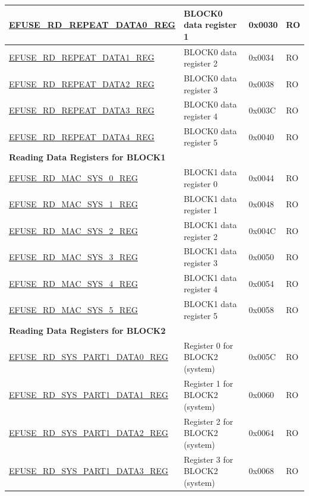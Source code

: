 \begin{longtable}{ | p{7cm} | p{7.2cm} | p{1.3cm} | p{1cm} | }
\hyperref[regdesc:EFUSERDREPEATDATA0REG]{EFUSE\_RD\_REPEAT\_DATA0\_REG} & BLOCK0 data register 1 & 0x0030 & RO \\ \hline
\hyperref[regdesc:EFUSERDREPEATDATA1REG]{EFUSE\_RD\_REPEAT\_DATA1\_REG} & BLOCK0 data register 2 & 0x0034 & RO \\ \hline
\hyperref[regdesc:EFUSERDREPEATDATA2REG]{EFUSE\_RD\_REPEAT\_DATA2\_REG} & BLOCK0 data register 3 & 0x0038 & RO \\ \hline
\hyperref[regdesc:EFUSERDREPEATDATA3REG]{EFUSE\_RD\_REPEAT\_DATA3\_REG} & BLOCK0 data register 4 & 0x003C & RO \\ \hline
\hyperref[regdesc:EFUSERDREPEATDATA4REG]{EFUSE\_RD\_REPEAT\_DATA4\_REG} & BLOCK0 data register 5 & 0x0040 & RO \\ \hline
\multicolumn{4}{|l|}{\textbf{Reading Data Registers for BLOCK1}} \\ \hline
\hyperref[regdesc:EFUSERDMACSYS0REG]{EFUSE\_RD\_MAC\_SYS\_0\_REG} & BLOCK1 data register 0 & 0x0044 & RO \\ \hline
\hyperref[regdesc:EFUSERDMACSYS1REG]{EFUSE\_RD\_MAC\_SYS\_1\_REG} & BLOCK1 data register 1 & 0x0048 & RO \\ \hline
\hyperref[regdesc:EFUSERDMACSYS2REG]{EFUSE\_RD\_MAC\_SYS\_2\_REG} & BLOCK1 data register 2 & 0x004C & RO \\ \hline
\hyperref[regdesc:EFUSERDMACSYS3REG]{EFUSE\_RD\_MAC\_SYS\_3\_REG} & BLOCK1 data register 3 & 0x0050 & RO \\ \hline
\hyperref[regdesc:EFUSERDMACSYS4REG]{EFUSE\_RD\_MAC\_SYS\_4\_REG} & BLOCK1 data register 4 & 0x0054 & RO \\ \hline
\hyperref[regdesc:EFUSERDMACSYS5REG]{EFUSE\_RD\_MAC\_SYS\_5\_REG} & BLOCK1 data register 5 & 0x0058 & RO \\ \hline
\multicolumn{4}{|l|}{\textbf{Reading Data Registers for BLOCK2}} \\ \hline
\hyperref[regdesc:EFUSERDSYSPART1DATANREG]{EFUSE\_RD\_SYS\_PART1\_DATA0\_REG} & Register 0 for BLOCK2 (system) & 0x005C & RO \\ \hline
\hyperref[regdesc:EFUSERDSYSPART1DATANREG]{EFUSE\_RD\_SYS\_PART1\_DATA1\_REG} & Register 1 for BLOCK2 (system) & 0x0060 & RO \\ \hline
\hyperref[regdesc:EFUSERDSYSPART1DATANREG]{EFUSE\_RD\_SYS\_PART1\_DATA2\_REG} & Register 2 for BLOCK2 (system) & 0x0064 & RO \\ \hline
\hyperref[regdesc:EFUSERDSYSPART1DATANREG]{EFUSE\_RD\_SYS\_PART1\_DATA3\_REG} & Register 3 for BLOCK2 (system) & 0x0068 & RO \\ \hline

\end{longtable}
